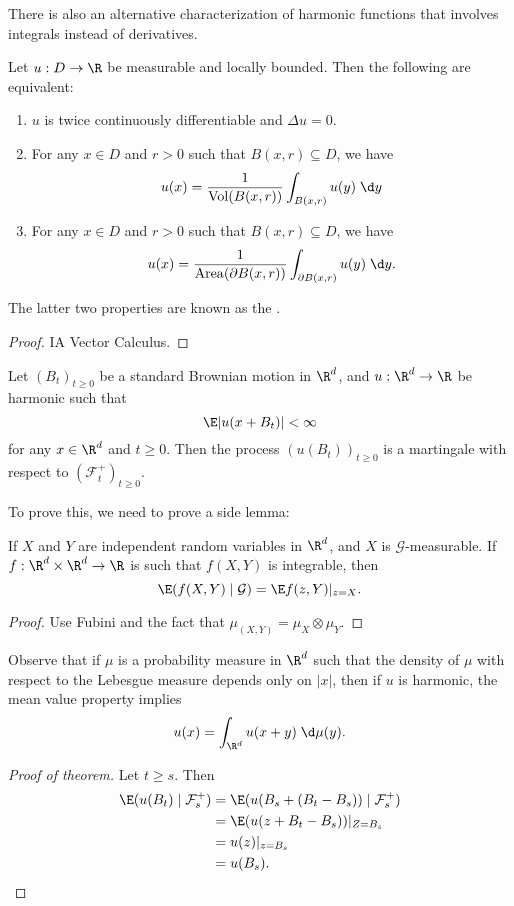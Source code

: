 \documentclass[a4paper]{article}
\begin{document}
There is also an alternative characterization of harmonic functions that involves integrals instead of derivatives.
\begin{lemma}
  Let $u: D \to \R$ be measurable and locally bounded. Then the following are equivalent:
  \begin{enumerate}
    \item $u$ is twice continuously differentiable and $\Delta u = 0$.
    \item For any $x \in D$ and $r > 0$ such that $B(x, r) \subseteq D$, we have
      \[
        u(x) = \frac{1}{\mathrm{Vol}(B(x, r))} \int_{B(x, r)} u(y) \;\d y
      \]
    \item For any $x \in D$ and $r > 0$ such that $B(x, r) \subseteq D$, we have
      \[
        u(x) = \frac{1}{\mathrm{Area}(\partial B(x, r))} \int_{\partial B(x, r)} u(y) \;\d y.
      \]
  \end{enumerate}
\end{lemma}
The latter two properties are known as the .

\begin{proof}
  IA Vector Calculus.
\end{proof}

\begin{thm}
  Let $(B_t)_{t \geq 0}$ be a standard Brownian motion in $\R^d$, and $u: \R^d \to \R$ be harmonic such that
  \[
    \E |u(x + B_t)| < \infty
  \]
  for any $x \in \R^d$ and $t \geq 0$. Then the process $(u(B_t))_{t \geq 0}$ is a martingale with respect to $(\mathcal{F}_t^+)_{t \geq 0}$.
\end{thm}

To prove this, we need to prove a side lemma:
\begin{lemma}
  If $X$ and $Y$ are independent random variables in $\R^d$, and $X$ is $\mathcal{G}$-measurable. If $f: \R^d \times \R^d \to \R$ is such that $f(X, Y)$ is integrable, then
  \[
    \E(f(X, Y) \mid \mathcal{G}) = \E f(z, Y)|_{z = X}.
  \]
\end{lemma}

\begin{proof}
  Use Fubini and the fact that $\mu_{(X, Y)} = \mu_X \otimes \mu_Y$.
\end{proof}

Observe that if $\mu$ is a probability measure in $\R^d$ such that the density of $\mu$ with respect to the Lebesgue measure depends only on $|x|$, then if $u$ is harmonic, the mean value property implies
\[
  u(x) = \int_{\R^d} u(x + y) \;\d \mu(y).
\]
\begin{proof}[Proof of theorem]
  Let $t \geq s$. Then
  \begin{align*}
    \E (u (B_t) \mid \mathcal{F}_s^+) &= \E(u(B_s + (B_t - B_s)) \mid \mathcal{F}_s^+)\\
    &= \E(u(z + B_t - B_s))|_{Z = B_s}\\
    &= u(z)|_{z = B_s}\\
    &= u(B_s).\qedhere
  \end{align*}
\end{proof}
\end{document}
